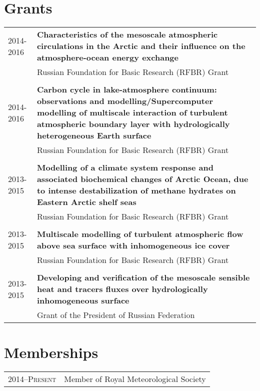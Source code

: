 \documentclass[a4paper,11pt]{article}
\newlength{\mycol}
\begin{document}
\section{Grants}
\begin{tabu} to 	
 2014-2016 & \textbf{Characteristics of the mesoscale atmospheric circulations in the Arctic and their influence on the atmosphere-ocean energy exchange} \\
& Russian Foundation for Basic Research (RFBR) Grant \\
 \\

 2014-2016 & \textbf{Carbon cycle in lake-atmosphere continuum: observations and modelling/Supercomputer modelling of multiscale interaction of turbulent atmospheric boundary layer with hydrologically heterogeneous Earth surface} \\
& Russian Foundation for Basic Research (RFBR) Grant \\
 \\

 2013-2015 & \textbf{Modelling of a climate system response and associated biochemical changes of Arctic Ocean, due to intense destabilization of methane hydrates on Eastern Arctic shelf seas}\\
& Russian Foundation for Basic Research (RFBR) Grant \\
 \\

 2013-2015 & \textbf{Multiscale modelling of turbulent atmospheric flow above sea surface with inhomogeneous ice cover}\\
& Russian Foundation for Basic Research (RFBR) Grant \\
 \\

 2013-2015 & \textbf{Developing and verification of the mesoscale sensible heat and tracers fluxes over hydrologically inhomogeneous surface} \\ 
& Grant of the President of Russian Federation
\end{tabu}

\section{Memberships}
\begin{tabu} to 	
 \textsc{2014--\small{Present}} & Member of Royal Meteorological Society
\end{tabu}
\end{document}
